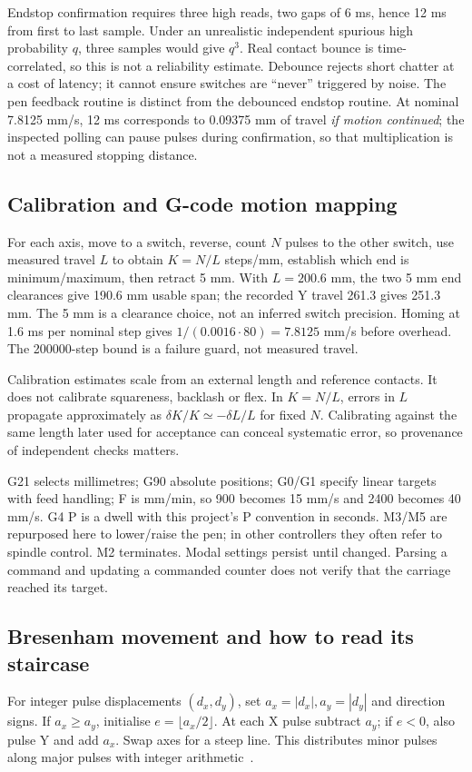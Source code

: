 Endstop confirmation requires three high reads, two gaps of 6 ms, hence
12 ms from first to last sample. Under an unrealistic independent spurious
high probability $q$, three samples would give $q^3$. Real contact bounce
is time-correlated, so this is not a reliability estimate. Debounce rejects
short chatter at a cost of latency; it cannot ensure switches are ``never''
triggered by noise. The pen feedback routine is distinct from the debounced
endstop routine. At nominal 7.8125 mm/s, 12 ms corresponds to 0.09375 mm
of travel \emph{if motion continued}; the inspected polling can pause pulses
during confirmation, so that multiplication is not a measured stopping distance.

\subsection{Calibration and G-code motion mapping}
For each axis, move to a switch, reverse, count $N$ pulses to the other
switch, use measured travel $L$ to obtain $K=N/L$ steps/mm, establish which
end is minimum/maximum, then retract 5 mm. With $L=200.6$ mm, the two 5 mm
end clearances give 190.6 mm usable span; the recorded Y travel 261.3 gives
251.3 mm. The 5 mm is a clearance choice, not an inferred switch precision.
Homing at 1.6 ms per nominal step gives
$1/(0.0016\cdot80)=7.8125$ mm/s before overhead.
The 200000-step bound is a failure guard, not measured travel.

Calibration estimates scale from an external length and reference contacts.
It does not calibrate squareness, backlash or flex. In $K=N/L$, errors in
$L$ propagate approximately as $\delta K/K\simeq-\delta L/L$ for fixed $N$.
Calibrating against the same length later used for acceptance can conceal
systematic error, so provenance of independent checks matters.

G21 selects millimetres; G90 absolute positions; G0/G1 specify linear targets
with feed handling; F is mm/min, so 900 becomes 15 mm/s and 2400 becomes
40 mm/s. G4 P is a dwell with this project's P convention in seconds.
M3/M5 are repurposed here to lower/raise the pen; in other controllers they
often refer to spindle control. M2 terminates. Modal settings persist until
changed. Parsing a command and updating a commanded counter does not verify
that the carriage reached its target.

\subsection{Bresenham movement and how to read its staircase}
For integer pulse displacements $(d_x,d_y)$, set
$a_x=|d_x|,a_y=|d_y|$ and direction signs. If $a_x\ge a_y$, initialise
$e=\lfloor a_x/2\rfloor$. At each X pulse subtract $a_y$; if $e<0$,
also pulse Y and add $a_x$. Swap axes for a steep line. This distributes
minor pulses along major pulses with integer arithmetic~\cite{bresenham1965}.

